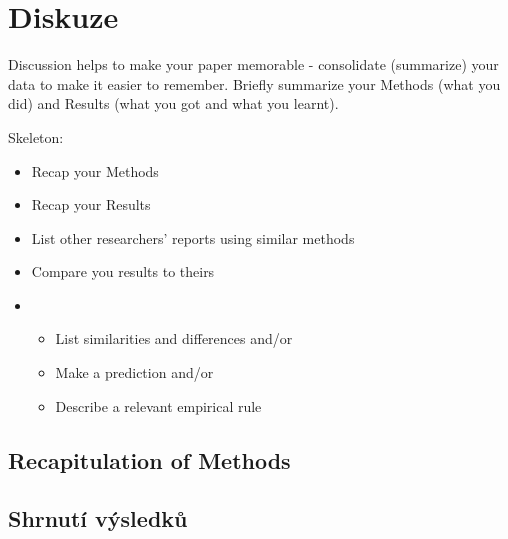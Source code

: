 \chapter{Diskuze} \label{chap:discussion}
Discussion helps to make your paper memorable - consolidate (summarize) your data to make it easier to remember. Briefly summarize your Methods (what you did) and Results (what you got and what you learnt).

Skeleton:
\begin{itemize}
    \item Recap your Methods
    \item Recap your Results
    \item List other researchers’ reports using similar methods
    \item Compare you results to theirs
    \item \begin{itemize}
        \item List similarities and differences and/or
        \item Make a prediction and/or
        \item Describe a relevant empirical rule
    \end{itemize}
\end{itemize}


\section{Recapitulation of Methods} \label{sec:recapitulation_of_methods}

\section{Shrnutí výsledků} \label{sec:summary_of_results}
